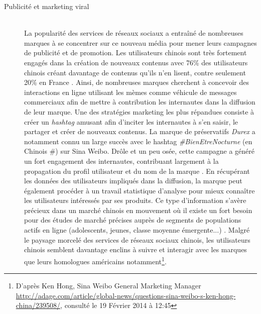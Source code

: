 \begin{description}
\item[Publicité et marketing viral]
\hfill \\
La popularité des services de réseaux sociaux a entra\^iné de nombreuses marques à se concentrer sur ce nouveau média pour mener leurs campagnes de publicité et de promotion. Les utilisateurs chinois sont très fortement engagés dans la création de nouveaux contenus avec 76\% des
utilisateurs chinois créant davantage de contenus qu{\textquoteright}ils n{\textquoteright}en lisent, contre seulement 20\% en France \citep{Forrester2013}. Ainsi, de nombreuses marques cherchent à concevoir des interactions en ligne utilisant les mèmes comme véhicule de messages commerciaux afin de
mettre à contribution les internautes dans la diffusion de leur marque. Une des stratégies marketing les plus répandues consiste à créer un \textit{hashtag} amusant afin d{\textquoteright}inciter les internautes à s{\textquoteright}en saisir, le partager et créer de nouveaux contenus. La marque de préservatifs \textit{Durex} a notamment connu un large succès avec le hashtag \textit{\#BienEtreNocturne} (en Chinois \#) sur Sina Weibo. Drôle et un peu osée, cette campagne a généré un fort engagement des internautes, contribuant largement à la propagation du profil utilisateur et du nom de la marque \citep{Shi2012}. En récupérant les données des utilisateurs impliqués dans la diffusion, la marque peut également procéder à un travail statistique d{\textquoteright}analyse pour mieux conna\^itre les utilisateurs intéressés par ses produits. Ce type d{\textquoteright}information s{\textquoteright}avère précieux dans un marché chinois en mouvement o\`u il existe un fort besoin pour des études de marché précises auprès de segments de populations actifs en ligne (adolescents, jeunes, classe moyenne émergente...) \citep{Bergstrom2012}. Malgré le paysage morcelé des services de réseaux sociaux chinois, les utilisateurs chinois semblent davantage enclins à suivre et interagir avec les marques que leurs homologues américains notamment\footnote{ D{\textquoteright}après Ken Hong, Sina Weibo General Marketing Manager  \url{http://adage.com/article/global-news/questions-sina-weibo-s-ken-hong-china/239508/,} consulté le 19 Février 2014 à 12:45}. 



\end{description}
